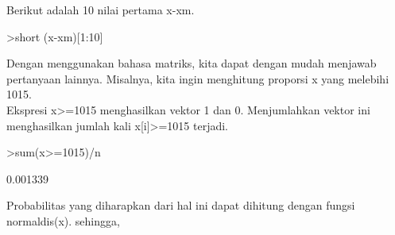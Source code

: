 \documentclass{article}
\begin{document}
\begin{eulernotebook}
\begin{eulercomment}
\begin{eulercomment}
\begin{eulercomment}
Berikut adalah 10 nilai pertama x-xm.
\end{eulercomment}
\begin{eulerprompt}
>short (x-xm)[1:10]
\end{eulerprompt}
\begin{euleroutput}
  [1.4664,  2.8367,  -4.573,  10.419,  -6.075,  -4.3474,  2.7294,
  -3.4693,  -1.1123,  -0.21472]
\end{euleroutput}
\begin{eulercomment}
Dengan menggunakan bahasa matriks, kita dapat dengan mudah menjawab
pertanyaan lainnya. Misalnya, kita ingin menghitung proporsi x yang
melebihi 1015.\\
Ekspresi x\textgreater{}=1015 menghasilkan vektor 1 dan 0. Menjumlahkan vektor ini
menghasilkan jumlah kali x[i]\textgreater{}=1015 terjadi.
\end{eulercomment}
\begin{eulerprompt}
>sum(x>=1015)/n
\end{eulerprompt}
\begin{euleroutput}
  0.001339
\end{euleroutput}
\begin{eulercomment}
Probabilitas yang diharapkan dari hal ini dapat dihitung dengan fungsi
normaldis(x). sehingga,


\end{eulercomment}
\end{eulercomment}
\end{eulercomment}
\end{eulernotebook}
\end{document}
